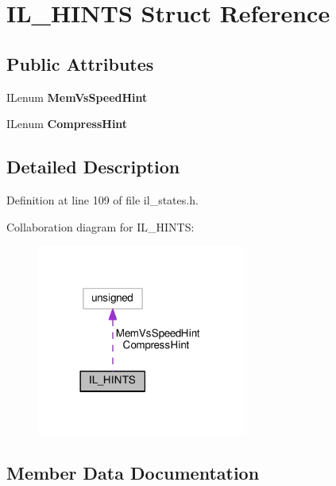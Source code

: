 \hypertarget{structIL__HINTS}{}\section{I\+L\+\_\+\+H\+I\+N\+TS Struct Reference}
\label{structIL__HINTS}
\subsection*{Public Attributes}
\begin{DoxyCompactItemize}
\item 
\mbox{\label{structIL__HINTS_a9ffff1d75274131973d0d51c6f9705ab}} 
I\+Lenum {\bfseries Mem\+Vs\+Speed\+Hint}
\item 
\mbox{\label{structIL__HINTS_a2d0ecc8cdcef457105e1d28525afea90}} 
I\+Lenum {\bfseries Compress\+Hint}
\end{DoxyCompactItemize}


\subsection{Detailed Description}


Definition at line 109 of file il\+\_\+states.\+h.



Collaboration diagram for I\+L\+\_\+\+H\+I\+N\+TS\+:
\nopagebreak
\begin{figure}[H]
\begin{center}
\leavevmode
\includegraphics[width=194pt]{d1/d96/structIL__HINTS__coll__graph}
\end{center}
\end{figure}


\subsection{Member Data Documentation}
\mbox{\label{structIL__HINTS_a2d0ecc8cdcef457105e1d28525afea90}} 
